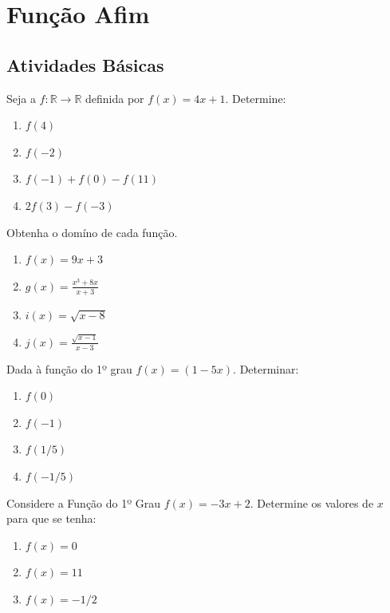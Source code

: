 \chapter{Função Afim}
		 \section{Atividades Básicas}	
		 	
		 	\item Seja a $f:\mathbb{R}\longrightarrow \mathbb{R}$ definida por $f(x)=4x+1$. Determine:
		 	\begin{multicols}{2}
		 	\begin{enumerate}
		 		\item $f(4)$
		 		\item $f(-2)$
		 		\item $f(-1)+f(0)-f(11)$
		 		\item $2f(3) - f(-3)$
		 	\end{enumerate}
		 	\end{multicols}
		 	
		 	\item Obtenha o domíno de cada função.
		 	\begin{multicols}{2}
		 	\begin{enumerate}
		 		\item $f(x)=9x+3$
		 		\item $g(x)=\displaystyle\frac{x^3 + 8x}{x+3}$
		 		\item $i(x) = \sqrt{x-8}$
		 		\item $j(x)=\displaystyle\frac{\sqrt{x-1}}{x-3}$
		 	\end{enumerate}
		 	\end{multicols}
		 	
		 	\item Dada à função do 1º grau $f(x) = (1 - 5x)$. Determinar:
		 	\begin{multicols}{4}
		 	\begin{enumerate}
		 		\item $f(0)$
		 		\item$f(-1)$
		 		\item $f(1/5)$
		 		\item $f(-1/5)$
		 	\end{enumerate}
			\end{multicols}		 	
		 				
			\item Considere a Função do 1º Grau $f(x) = -3x + 2$. Determine os valores de $x$ para que se tenha:
			\begin{multicols}{3}
			\begin{enumerate}
				\item $f(x) = 0$
				\item $f(x) = 11$
				\item $f(x) = -1/2$
			\end{enumerate}
			\end{multicols}
			
